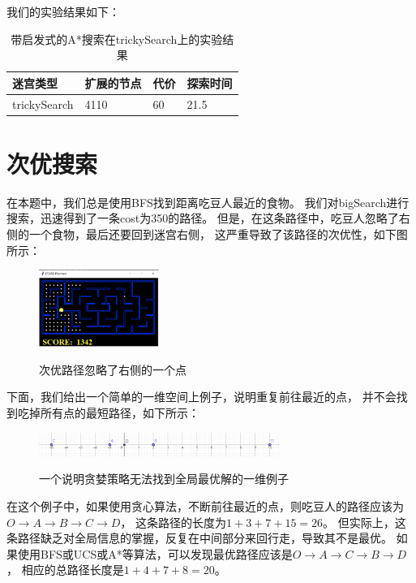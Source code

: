 \documentclass{article}
\begin{document}
我们的实验结果如下：
\begin{table}[H]
	\centering
	\caption{带启发式的A*搜索在trickySearch上的实验结果}
	\begin{tabular}{llll}
		\hline
	迷宫类型         & 扩展的节点 & 代价 & 探索时间 \\ \hline
	trickySearch & 4110  & 60 & 21.5 \\ \hline
	\end{tabular}
	\end{table}

\section{次优搜索}
在本题中，我们总是使用BFS找到距离吃豆人最近的食物。
我们对bigSearch进行搜索，迅速得到了一条cost为350的路径。
但是，在这条路径中，吃豆人忽略了右侧的一个食物，最后还要回到迷宫右侧，
这严重导致了该路径的次优性，如下图所示：

\begin{figure}[H]
	\centering
	{\includegraphics[width=0.35\textwidth]{image//ignorance.png}} 
	\caption{次优路径忽略了右侧的一个点}
\end{figure}

下面，我们给出一个简单的一维空间上例子，说明重复前往最近的点，
并不会找到吃掉所有点的最短路径，如下所示：
\begin{figure}[H]
	\centering
	{\includegraphics[width=0.7\textwidth]{image//example.png}} 
	\caption{一个说明贪婪策略无法找到全局最优解的一维例子}
\end{figure}
在这个例子中，如果使用贪心算法，不断前往最近的点，则吃豆人的路径应该为$O\to A \to B \to C \to D$，
这条路径的长度为$1+3+7+15=26$。
但实际上，这条路径缺乏对全局信息的掌握，反复在中间部分来回行走，导致其不是最优。
如果使用BFS或UCS或A*等算法，可以发现最优路径应该是$O \to A \to C \to B \to D$，
相应的总路径长度是$1+4+7+8 =20$。
\end{document}
